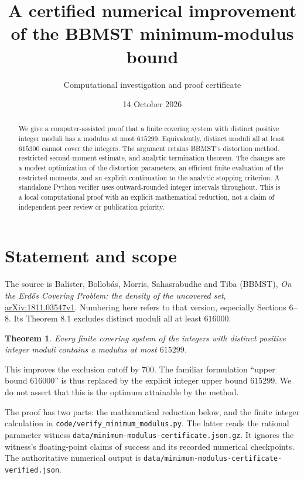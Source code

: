 \documentclass[11pt]{article}
\title{A certified numerical improvement of the BBMST minimum-modulus bound}
\author{Computational investigation and proof certificate}
\date{14 October 2026}
\newtheorem{theorem}{Theorem}
\begin{document}
\maketitle

\begin{abstract}
We give a computer-assisted proof that a finite covering system with distinct
positive integer moduli has a modulus at most $615299$. Equivalently, distinct
moduli all at least $615300$ cannot cover the integers. The argument retains
BBMST's distortion method, restricted second-moment estimate, and analytic
termination theorem. The changes are a modest optimization of the distortion
parameters, an efficient finite evaluation of the restricted moments, and an
explicit continuation to the analytic stopping criterion. A standalone Python
verifier uses outward-rounded integer intervals throughout. This is a local
computational proof with an explicit mathematical reduction, not a claim of
independent peer review or publication priority.
\end{abstract}

\section{Statement and scope}
The source is Balister, Bollob\'as, Morris, Sahasrabudhe and Tiba (BBMST),
\emph{On the Erd\H{o}s Covering Problem: the density of the uncovered set},
\href{https://arxiv.org/html/1811.03547v1}{arXiv:1811.03547v1}.
Numbering here refers to that version, especially Sections 6--8.
Its Theorem 8.1 excludes distinct moduli all at least $616000$.

\begin{theorem}\label{thm:main}
Every finite covering system of the integers with distinct positive integer
moduli contains a modulus at most $615299$.
\end{theorem}

This improves the exclusion cutoff by $700$. The familiar formulation ``upper
bound $616000$'' is thus replaced by the explicit integer upper bound $615299$.
We do not assert that this is the optimum attainable by the method.

The proof has two parts: the mathematical reduction below, and the finite
integer calculation in \texttt{code/verify\_minimum\_modulus.py}.
The latter reads the rational parameter witness
\texttt{data/minimum-modulus-certificate.json.gz}. It ignores the witness's
floating-point claims of success and its recorded numerical checkpoints.
The authoritative numerical output is
\texttt{data/minimum-modulus-certificate-verified.json}.
\end{document}
